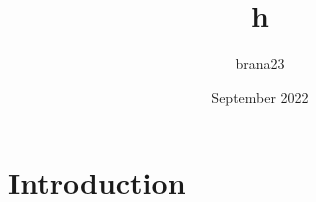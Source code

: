 \documentclass{article}
\title{h}
\author{brana23 }
\date{September 2022}
\begin{document}
\maketitle

\section{Introduction}
\end{document}
